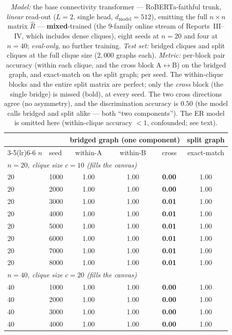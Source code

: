 \documentclass[11pt,a4paper]{article}
\begin{document}
\begin{table}[H]\centering\small
\begin{tabular}{llcccc}
\toprule
 & & \multicolumn{3}{c}{bridged graph (one component)} & split graph \\
\cmidrule(lr){3-5}\cmidrule(lr){6-6}
$n$ & seed & within-A & within-B & cross & exact-match \\
\midrule
\multicolumn{6}{l}{\emph{$n=20$, clique size $c=10$ (fills the canvas)}} \\
20 & 1000 & 1.00 & 1.00 & \textbf{0.00} & 1.00 \\
20 & 2000 & 1.00 & 1.00 & \textbf{0.00} & 1.00 \\
20 & 3000 & 1.00 & 1.00 & \textbf{0.01} & 1.00 \\
20 & 4000 & 1.00 & 1.00 & \textbf{0.01} & 1.00 \\
20 & 5000 & 1.00 & 1.00 & \textbf{0.01} & 1.00 \\
20 & 6000 & 1.00 & 1.00 & \textbf{0.01} & 1.00 \\
20 & 7000 & 1.00 & 1.00 & \textbf{0.01} & 1.00 \\
20 & 8000 & 1.00 & 1.00 & \textbf{0.01} & 1.00 \\
\multicolumn{6}{l}{\emph{$n=40$, clique size $c=20$ (fills the canvas)}} \\
40 & 1000 & 1.00 & 1.00 & \textbf{0.00} & 1.00 \\
40 & 2000 & 1.00 & 1.00 & \textbf{0.00} & 1.00 \\
40 & 3000 & 1.00 & 1.00 & \textbf{0.00} & 1.00 \\
40 & 4000 & 1.00 & 1.00 & \textbf{0.00} & 1.00 \\
\bottomrule
\end{tabular}
\caption{\emph{Model:} the base connectivity transformer --- RoBERTa-faithful trunk, \emph{linear}
read-out ($L=2$, single head, $d_{\mathrm{model}}=512$), emitting the full $n\times n$ matrix
$\hat R$ --- \textbf{mixed}-trained (the $9$-family online stream of Reports~III--IV, which includes
dense cliques), eight seeds at $n=20$ and four at $n=40$; \emph{eval-only}, no further training.
\emph{Test set:} bridged cliques and split cliques at the full clique size ($2{,}000$ graphs each).
\emph{Metric:} per-block pair accuracy (within each clique, and the cross block A$\leftrightarrow$B)
on the bridged graph, and exact-match on the split graph; per seed. The within-clique blocks and
the entire split matrix are perfect; only the \emph{cross} block (the single bridge) is missed
(bold), at every seed. The two cross directions agree (no asymmetry), and the discrimination
accuracy is $0.50$ (the model calls bridged and split alike --- both ``two components''). The ER
model is omitted here (within-clique accuracy $<1$, confounded; see text).}
\label{tab:base_blocks}
\end{table}
\end{document}
